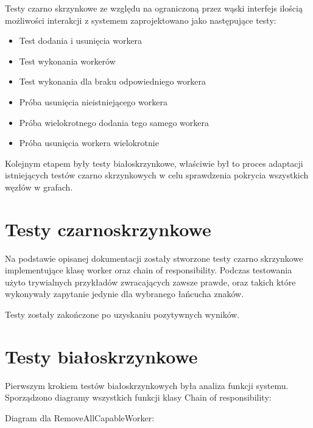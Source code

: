 \documentclass[paper=a4, fontsize=11pt]{scrartcl} %
\numberwithin{equation}{section} %
\numberwithin{figure}{section} %
\numberwithin{table}{section} %
\begin{document}
Testy czarno skrzynkowe ze względu na ograniczoną przez wąski interfejs ilością możliwości interakcji z
systemem zaprojektowano jako następujące testy:
\begin{itemize}
  \item Test dodania i usunięcia workera
  \item Test wykonania workerów
  \item Test wykonania dla braku odpowiedniego workera
  \item Próba usunięcia nieistniejącego workera
  \item Próba wielokrotnego dodania tego samego workera
  \item Próba usunięcia workera wielokrotnie
\end{itemize}

Kolejnym etapem były testy białoskrzynkowe, właściwie był to proces adaptacji istniejących testów czarno skrzynkowych
w celu sprawdzenia pokrycia wszystkich węzłów w grafach.

\section{Testy czarnoskrzynkowe }

Na podstawie opisanej dokumentacji zostały stworzone testy czarno skrzynkowe implementujące klasę
worker oraz chain of responsibility. Podczas testowania użyto trywialnych przykładów zwracających zawsze
prawde, oraz takich które wykonywały zapytanie jedynie dla wybranego łańcucha znaków.

Testy zostały zakończone po uzyskaniu pozytywnych wyników.


\section{Testy białoskrzynkowe }

Pierwszym krokiem testów białoskrzynkowych była analiza funkcji systemu.
Sporządzono diagramy wszystkich funkcji klasy Chain of responsibility:

Diagram dla RemoveAllCapableWorker:
\end{document}
